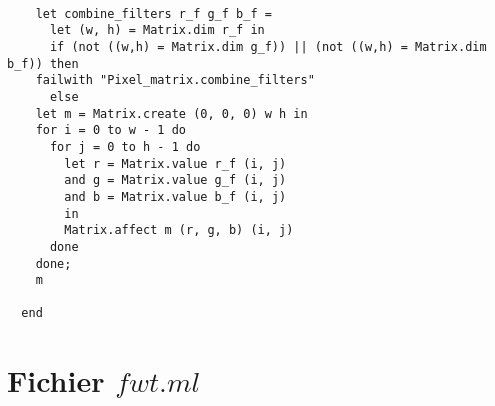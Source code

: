\documentclass[a4paper,10pt]{report}
\theoremstyle{break}
\begin{document}
\newpage
    \begin{lstlisting}

    let combine_filters r_f g_f b_f =
      let (w, h) = Matrix.dim r_f in
      if (not ((w,h) = Matrix.dim g_f)) || (not ((w,h) = Matrix.dim b_f)) then 
	failwith "Pixel_matrix.combine_filters"
      else
	let m = Matrix.create (0, 0, 0) w h in
	for i = 0 to w - 1 do
	  for j = 0 to h - 1 do
	    let r = Matrix.value r_f (i, j)
	    and g = Matrix.value g_f (i, j)
	    and b = Matrix.value b_f (i, j)
	    in
	    Matrix.affect m (r, g, b) (i, j)
	  done
	done;
	m

  end
    \end{lstlisting}

  \section*{Fichier $fwt.ml$}
\end{document}
